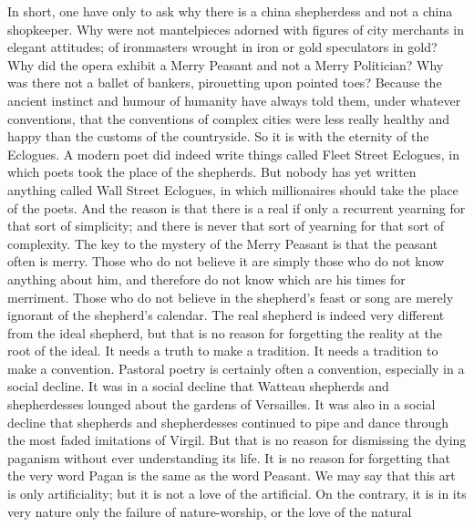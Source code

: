 In short, one have only to ask why there is a china shepherdess and not a china shopkeeper. Why were not mantelpieces adorned with figures of city merchants in elegant attitudes; of ironmasters wrought in iron or gold speculators in gold? Why did the opera exhibit a Merry Peasant and not a Merry Politician? Why was there not a ballet of bankers, pirouetting upon pointed toes? Because the ancient instinct and humour of humanity have always told them, under whatever conventions, that the conventions of complex cities were less really healthy and happy than the customs of the countryside. So it is with the eternity of the Eclogues. A modern poet did indeed write things called Fleet Street Eclogues, in which poets took the place of the shepherds. But nobody has yet written anything called Wall Street Eclogues, in which millionaires should take the place of the poets. And the reason is that there is a real if only a recurrent yearning for that sort of simplicity; and there is never that sort of yearning for that sort of complexity. The key to the mystery of the Merry Peasant is that the peasant often is merry. Those who do not believe it are simply those who do not know anything about him, and therefore do not know which are his times for merriment. Those who do not believe in the shepherd's feast or song are merely ignorant of the shepherd's calendar. The real shepherd is indeed very different from the ideal shepherd, but that is no reason for forgetting the reality at the root of the ideal. It needs a truth to make a tradition. It needs a tradition to make a convention. Pastoral poetry is certainly often a convention, especially in a social decline. It was in a social decline that Watteau shepherds and shepherdesses lounged about the gardens of Versailles. It was also in a social decline that shepherds and shepherdesses continued to pipe and dance through the most faded imitations of Virgil. But that is no reason for dismissing the dying paganism without ever understanding its life. It is no reason for forgetting that the very word Pagan is the same as the word Peasant. We may say that this art is only artificiality; but it is not a love of the artificial. On the contrary, it is in its very nature only the failure of nature-worship, or the love of the natural

